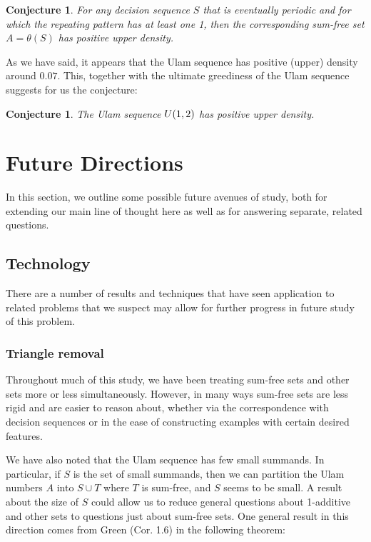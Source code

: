 \documentclass{report}
\newtheorem{conjecture}[theorem]{Conjecture}
\theoremstyle{remark}
\numberwithin{equation}{section}
\begin{document}
\begin{conjecture}
  For any decision sequence $S$ that is eventually periodic and for
  which the repeating pattern has at least one 1, then the
  corresponding sum-free set $A = \theta(S)$ has positive upper
  density.
\end{conjecture}

As we have said, it appears that the Ulam sequence has positive
(upper) density around $0.07$.  This, together with the ultimate
greediness of the Ulam sequence suggests for us the conjecture:

\begin{conjecture}
  The Ulam sequence $U(1,2)$ has positive upper density.
\end{conjecture}

\chapter{Future Directions}

In this section, we outline some possible future avenues of study,
both for extending our main line of thought here as well as for
answering separate, related questions.  

\section{Technology}

There are a number of results and techniques that have seen
application to related problems that we suspect may allow for further
progress in future study of this problem.  

\subsection{Triangle removal}

Throughout much of this study, we have been treating sum-free sets and
other \relevant sets more or less simultaneously.  However, in many
ways sum-free sets are less rigid and are easier to reason about,
whether via the correspondence with decision sequences or in the ease
of constructing examples with certain desired features.

We have also noted that the Ulam sequence has few small summands.  In
particular, if $S$ is the set of small summands, then we can partition
the Ulam numbers $A$ into $S \cup T$ where $T$ is sum-free, and $S$
seems to be small.  A result about the size of $S$ could allow us to
reduce general questions about 1-additive and other \relevant sets to
questions just about sum-free sets.  One general result in this
direction comes from Green \cite{green:gfa2005} (Cor. 1.6) in the
following theorem:
\end{document}
